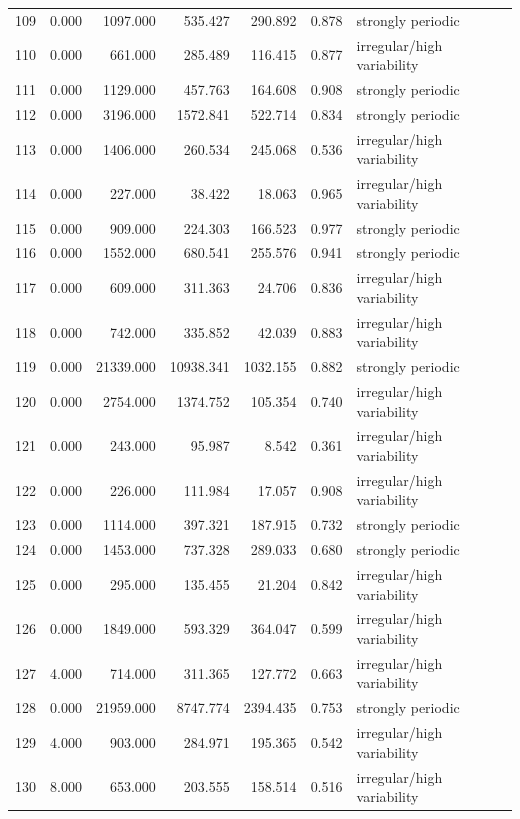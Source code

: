 \begin{longtable}{lrrrrrl}
109 & 0.000 & 1097.000 & 535.427 & 290.892 & 0.878 & strongly periodic \\
110 & 0.000 & 661.000 & 285.489 & 116.415 & 0.877 & irregular/high variability \\
111 & 0.000 & 1129.000 & 457.763 & 164.608 & 0.908 & strongly periodic \\
112 & 0.000 & 3196.000 & 1572.841 & 522.714 & 0.834 & strongly periodic \\
113 & 0.000 & 1406.000 & 260.534 & 245.068 & 0.536 & irregular/high variability \\
114 & 0.000 & 227.000 & 38.422 & 18.063 & 0.965 & irregular/high variability \\
115 & 0.000 & 909.000 & 224.303 & 166.523 & 0.977 & strongly periodic \\
116 & 0.000 & 1552.000 & 680.541 & 255.576 & 0.941 & strongly periodic \\
117 & 0.000 & 609.000 & 311.363 & 24.706 & 0.836 & irregular/high variability \\
118 & 0.000 & 742.000 & 335.852 & 42.039 & 0.883 & irregular/high variability \\
119 & 0.000 & 21339.000 & 10938.341 & 1032.155 & 0.882 & strongly periodic \\
120 & 0.000 & 2754.000 & 1374.752 & 105.354 & 0.740 & irregular/high variability \\
121 & 0.000 & 243.000 & 95.987 & 8.542 & 0.361 & irregular/high variability \\
122 & 0.000 & 226.000 & 111.984 & 17.057 & 0.908 & irregular/high variability \\
123 & 0.000 & 1114.000 & 397.321 & 187.915 & 0.732 & strongly periodic \\
124 & 0.000 & 1453.000 & 737.328 & 289.033 & 0.680 & strongly periodic \\
125 & 0.000 & 295.000 & 135.455 & 21.204 & 0.842 & irregular/high variability \\
126 & 0.000 & 1849.000 & 593.329 & 364.047 & 0.599 & irregular/high variability \\
127 & 4.000 & 714.000 & 311.365 & 127.772 & 0.663 & irregular/high variability \\
128 & 0.000 & 21959.000 & 8747.774 & 2394.435 & 0.753 & strongly periodic \\
129 & 4.000 & 903.000 & 284.971 & 195.365 & 0.542 & irregular/high variability \\
130 & 8.000 & 653.000 & 203.555 & 158.514 & 0.516 & irregular/high variability \\

\end{longtable}
